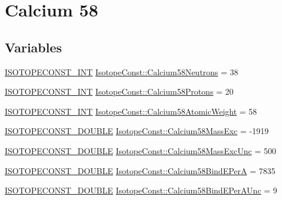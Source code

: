 \hypertarget{group___isotope_const-_calcium-_ca58}{}\section{Calcium 58}
\label{group___isotope_const-_calcium-_ca58}
\subsection*{Variables}
\begin{DoxyCompactItemize}
\item 
\mbox{\hyperlink{group___isotope_const-_macros_ga5f18360b3e99483a35c32d789e62621c}{I\+S\+O\+T\+O\+P\+E\+C\+O\+N\+S\+T\+\_\+\+I\+NT}} \mbox{\hyperlink{group___isotope_const-_calcium-_ca58_gaa0c449bdc622a41e8f9ed09bad7c979e}{Isotope\+Const\+::\+Calcium58\+Neutrons}} = 38
\item 
\mbox{\hyperlink{group___isotope_const-_macros_ga5f18360b3e99483a35c32d789e62621c}{I\+S\+O\+T\+O\+P\+E\+C\+O\+N\+S\+T\+\_\+\+I\+NT}} \mbox{\hyperlink{group___isotope_const-_calcium-_ca58_ga3ad906ca9fd2ae2f1d244ca2e9452abb}{Isotope\+Const\+::\+Calcium58\+Protons}} = 20
\item 
\mbox{\hyperlink{group___isotope_const-_macros_ga5f18360b3e99483a35c32d789e62621c}{I\+S\+O\+T\+O\+P\+E\+C\+O\+N\+S\+T\+\_\+\+I\+NT}} \mbox{\hyperlink{group___isotope_const-_calcium-_ca58_gac7a2c5c1bbdb2016b49f13c91426f200}{Isotope\+Const\+::\+Calcium58\+Atomic\+Weight}} = 58
\item 
\mbox{\hyperlink{group___isotope_const-_macros_ga8f45a7272ce02c0b4c65c44636ed719a}{I\+S\+O\+T\+O\+P\+E\+C\+O\+N\+S\+T\+\_\+\+D\+O\+U\+B\+LE}} \mbox{\hyperlink{group___isotope_const-_calcium-_ca58_ga9f503b718aa3dfb61af2b793e0760f2e}{Isotope\+Const\+::\+Calcium58\+Mass\+Exc}} = -\/1919
\item 
\mbox{\hyperlink{group___isotope_const-_macros_ga8f45a7272ce02c0b4c65c44636ed719a}{I\+S\+O\+T\+O\+P\+E\+C\+O\+N\+S\+T\+\_\+\+D\+O\+U\+B\+LE}} \mbox{\hyperlink{group___isotope_const-_calcium-_ca58_gad90bdb281f61b663f88e46ac4657094f}{Isotope\+Const\+::\+Calcium58\+Mass\+Exc\+Unc}} = 500
\item 
\mbox{\hyperlink{group___isotope_const-_macros_ga8f45a7272ce02c0b4c65c44636ed719a}{I\+S\+O\+T\+O\+P\+E\+C\+O\+N\+S\+T\+\_\+\+D\+O\+U\+B\+LE}} \mbox{\hyperlink{group___isotope_const-_calcium-_ca58_gac702460e686fe9ed27dc34c616cd85d5}{Isotope\+Const\+::\+Calcium58\+Bind\+E\+PerA}} = 7835
\item 
\mbox{\hyperlink{group___isotope_const-_macros_ga8f45a7272ce02c0b4c65c44636ed719a}{I\+S\+O\+T\+O\+P\+E\+C\+O\+N\+S\+T\+\_\+\+D\+O\+U\+B\+LE}} \mbox{\hyperlink{group___isotope_const-_calcium-_ca58_ga0b563db9e0538ebe158219bada1bb135}{Isotope\+Const\+::\+Calcium58\+Bind\+E\+Per\+A\+Unc}} = 9

\end{DoxyCompactItemize}
